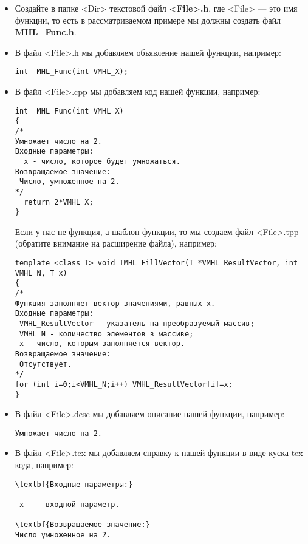 \begin{itemize}
\item Создайте в папке <Dir> текстовой файл \textbf{<File>.h}, где <File> --- это имя функции, то есть в рассматриваемом примере мы должны создать файл \textbf{MHL\_Func.h}.
\item В файл <File>.h мы добавляем объявление нашей функции, например:
\begin{lstlisting}[label=examplefileh, caption=Содержимое MHL\_Func.h]
int  MHL_Func(int VMHL_X);
\end{lstlisting}
\item В файл <File>.cpp мы добавляем код нашей функции, например:
\begin{lstlisting}[label=examplefilecpp, caption=Содержимое MHL\_Func.cpp]
int  MHL_Func(int VMHL_X)
{
/*
Умножает число на 2.
Входные параметры:
  x - число, которое будет умножаться.
Возвращаемое значение:
 Число, умноженное на 2.
*/
  return 2*VMHL_X;
}
\end{lstlisting}

Если у нас не функция, а шаблон функции, то мы создаем файл <File>.tpp (обратите внимание на расширение файла), например:
\begin{lstlisting}[label=examplefiletpp, caption=Содержимое TMHL\_FillVector.tpp]
template <class T> void TMHL_FillVector(T *VMHL_ResultVector, int VMHL_N, T x)
{
/*
Функция заполняет вектор значениями, равных x.
Входные параметры:
 VMHL_ResultVector - указатель на преобразуемый массив;
 VMHL_N - количество элементов в массиве;
 x - число, которым заполняется вектор.
Возвращаемое значение:
 Отсутствует.
*/
for (int i=0;i<VMHL_N;i++) VMHL_ResultVector[i]=x;
}
\end{lstlisting}

\item В файл <File>.desc мы добавляем описание нашей функции, например:
\begin{lstlisting}[label=examplefiledesc, caption=Содержимое MHL\_Func.desc]
Умножает число на 2.
\end{lstlisting}

\item В файл <File>.tex мы добавляем справку к нашей функции в виде куска tex кода, например:
\begin{lstlisting}[label=examplefiletex, caption=Содержимое MHL\_Func.tex]
\textbf{Входные параметры:}

 x --- входной параметр.

\textbf{Возвращаемое значение:}
Число умноженное на 2.
\end{lstlisting}


\end{itemize}
